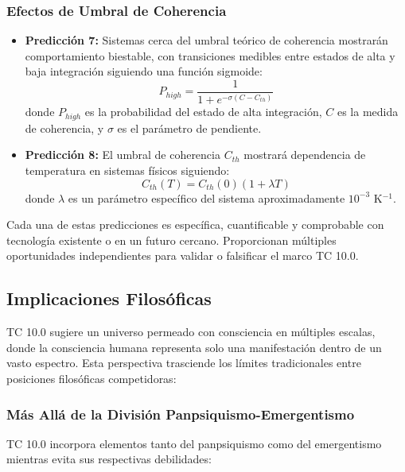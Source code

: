 \documentclass[12pt]{article}
\begin{document}
\subsubsection{Efectos de Umbral de Coherencia}

\begin{itemize}
    \item \textbf{Predicción 7:} Sistemas cerca del umbral teórico de coherencia mostrarán comportamiento biestable, con transiciones medibles entre estados de alta y baja integración siguiendo una función sigmoide:
    \begin{equation}
    P_{high} = \frac{1}{1 + e^{-\sigma(C - C_{th})}}
    \end{equation}
    donde $P_{high}$ es la probabilidad del estado de alta integración, $C$ es la medida de coherencia, y $\sigma$ es el parámetro de pendiente.
    
    \item \textbf{Predicción 8:} El umbral de coherencia $C_{th}$ mostrará dependencia de temperatura en sistemas físicos siguiendo:
    \begin{equation}
    C_{th}(T) = C_{th}(0)(1 + \lambda T)
    \end{equation}
    donde $\lambda$ es un parámetro específico del sistema aproximadamente $10^{-3}$ K$^{-1}$.
\end{itemize}

Cada una de estas predicciones es específica, cuantificable y comprobable con tecnología existente o en un futuro cercano. Proporcionan múltiples oportunidades independientes para validar o falsificar el marco TC 10.0.

\subsection{Implicaciones Filosóficas}

TC 10.0 sugiere un universo permeado con consciencia en múltiples escalas, donde la consciencia humana representa solo una manifestación dentro de un vasto espectro. Esta perspectiva trasciende los límites tradicionales entre posiciones filosóficas competidoras:

\subsubsection{Más Allá de la División Panpsiquismo-Emergentismo}

TC 10.0 incorpora elementos tanto del panpsiquismo como del emergentismo mientras evita sus respectivas debilidades:
\end{document}
